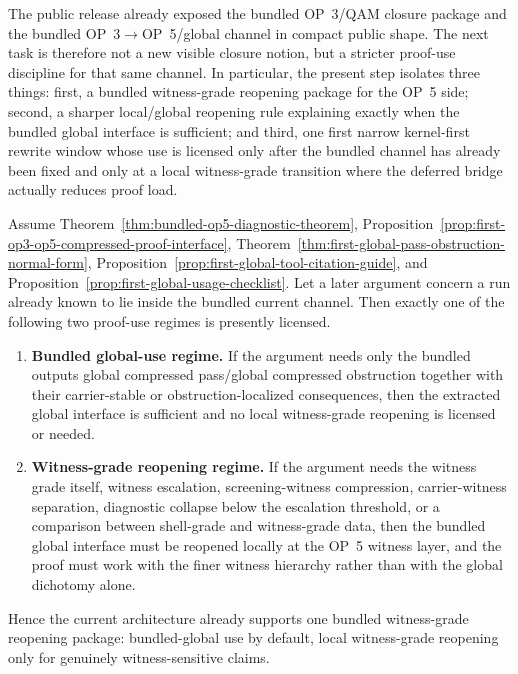 \begin{remark}
The public  release already exposed the bundled OP~3/QAM closure package and the bundled OP~3$\to$OP~5/global channel in compact public shape. The next task is therefore not a new visible closure notion, but a stricter proof-use discipline for that same channel. In particular, the present step isolates three things: first, a bundled witness-grade reopening package for the OP~5 side; second, a sharper local/global reopening rule explaining exactly when the bundled global interface is sufficient; and third, one first narrow kernel-first rewrite window whose use is licensed only after the bundled channel has already been fixed and only at a local witness-grade transition where the deferred bridge actually reduces proof load.
\end{remark}

\begin{theorem}
\label{thm:bundled-witness-grade-reopening-package}
Assume Theorem~\ref{thm:bundled-op5-diagnostic-theorem}, Proposition~\ref{prop:first-op3-op5-compressed-proof-interface}, Theorem~\ref{thm:first-global-pass-obstruction-normal-form}, Proposition~\ref{prop:first-global-tool-citation-guide}, and Proposition~\ref{prop:first-global-usage-checklist}. Let a later argument concern a run already known to lie inside the bundled current channel. Then exactly one of the following two proof-use regimes is presently licensed.
\begin{enumerate}[leftmargin=2em,label=(\roman*)]
\item \textbf{Bundled global-use regime.} If the argument needs only the bundled outputs global compressed pass/global compressed obstruction together with their carrier-stable or obstruction-localized consequences, then the extracted global interface is sufficient and no local witness-grade reopening is licensed or needed.
\item \textbf{Witness-grade reopening regime.} If the argument needs the witness grade itself, witness escalation, screening-witness compression, carrier-witness separation, diagnostic collapse below the escalation threshold, or a comparison between shell-grade and witness-grade data, then the bundled global interface must be reopened locally at the OP~5 witness layer, and the proof must work with the finer witness hierarchy rather than with the global dichotomy alone.
\end{enumerate}
Hence the current architecture already supports one bundled witness-grade reopening package: bundled-global use by default, local witness-grade reopening only for genuinely witness-sensitive claims.
\end{theorem}

